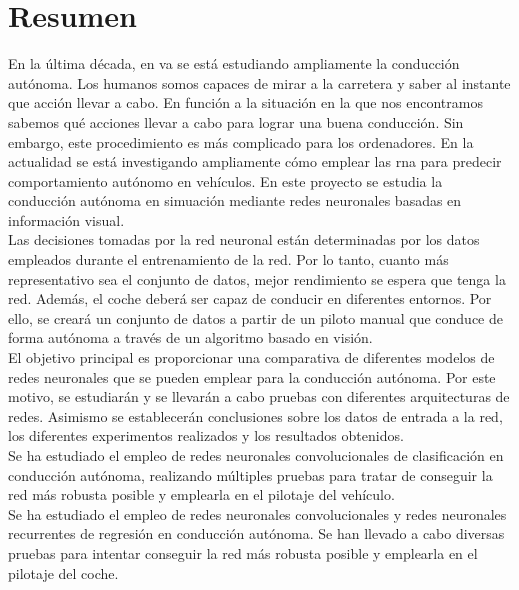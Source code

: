 \chapter*{Resumen}

En la última década, en \acrfull{va} se está estudiando ampliamente la conducción autónoma. Los humanos somos capaces de mirar a la carretera y saber al instante que acción llevar a cabo. En función a la situación en la que nos encontramos sabemos qué acciones llevar a cabo para lograr una buena conducción.  Sin embargo, este procedimiento es más complicado para los ordenadores. En la actualidad se está investigando ampliamente cómo emplear las \acrfull{rna} para predecir comportamiento autónomo en vehículos. En este proyecto se estudia la conducción autónoma en simuación mediante redes neuronales basadas en información visual.\\

Las decisiones tomadas por la red neuronal están determinadas por los datos empleados durante el entrenamiento de la red. Por lo tanto, cuanto más representativo sea el conjunto de datos, mejor rendimiento se espera que tenga la red. Además, el coche deberá ser capaz de conducir en diferentes entornos. Por ello, se creará un conjunto de datos a partir de un piloto manual que conduce de forma autónoma a través de un algoritmo basado en visión.\\


El objetivo principal es proporcionar una comparativa de diferentes modelos de redes neuronales que se pueden emplear para la conducción autónoma. Por este motivo, se estudiarán y se llevarán a cabo pruebas con diferentes arquitecturas de redes. Asimismo se establecerán conclusiones sobre los datos de entrada a la red, los diferentes experimentos realizados y los resultados obtenidos. \\

Se ha estudiado el empleo de redes neuronales convolucionales de clasificación en conducción autónoma, realizando múltiples pruebas para tratar de conseguir la red más robusta posible y emplearla en el pilotaje del vehículo.\\

Se ha estudiado el empleo de redes neuronales convolucionales y redes neuronales recurrentes de regresión en conducción autónoma. Se han llevado a cabo diversas pruebas para intentar conseguir la red más robusta posible y emplearla en el pilotaje del coche.
